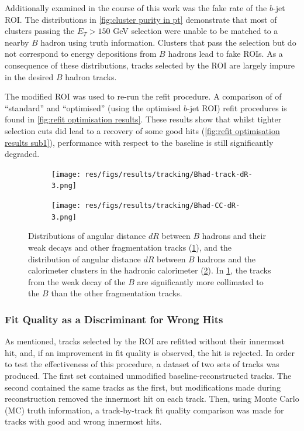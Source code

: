 Additionally examined in the course of this work was the fake rate of the $b$-jet ROI. The distributions in \cref{fig:cluster purity in pt} demonstrate that most of clusters passing the $E_T > 150$ GeV selection were unable to be matched to a nearby $B$ hadron using truth information. Clusters that pass the selection but do not correspond to energy depositions from $B$ hadrons lead to fake ROIs. As a consequence of these distributions, tracks selected by the ROI are largely impure in the desired $B$ hadron tracks.

The modified ROI was used to re-run the refit procedure. A comparison of of ``standard'' and ``optimised'' (using the optimised $b$-jet ROI) refit procedures is found in \cref{fig:refit optimisation results}. These results show that whilst tighter selection cuts did lead to a recovery of some good hits (\cref{fig:refit optimisation results sub1}), performance with respect to the baseline is still significantly degraded. 

%
\begin{figure}[!htbp]
    \centering
    \begin{subfigure}{.5\textwidth}
      \centering
      \texttt{[image: res/figs/results/tracking/Bhad-track-dR-3.png]}
      \caption{}
      \label{fig:B dR match sub1}
    \end{subfigure}%
    \begin{subfigure}{.5\textwidth}
      \centering
      \texttt{[image: res/figs/results/tracking/Bhad-CC-dR-3.png]}
      \caption{}
      \label{fig:B dR match sub2}
    \end{subfigure}
    \caption{Distributions of angular distance $dR$ between $B$ hadrons and their weak decays and other fragmentation tracks (\cref{fig:B dR match sub1}), and the distribution of angular distance $dR$ between $B$ hadrons and the calorimeter clusters in the hadronic calorimeter (\cref{fig:B dR match sub2}). In \cref{fig:B dR match sub1}, the tracks from the weak decay of the $B$ are significantly more collimated to the $B$ than the other fragmentation tracks.}
    \label{fig:B dR match}
\end{figure}
%

\subsubsection{Fit Quality as a Discriminant for Wrong Hits}
As mentioned, tracks selected by the ROI are refitted without their innermost hit, and, if an improvement in fit quality is observed, the hit is rejected. In order to test the effectiveness of this procedure, a dataset of two sets of tracks was produced. The first set contained unmodified baseline-reconstructed tracks. The second contained the same tracks as the first, but modifications made during reconstruction removed the innermost hit on each track. Then, using Monte Carlo (MC) truth information, a track-by-track fit quality comparison was made for tracks with good and wrong innermost hits. 

